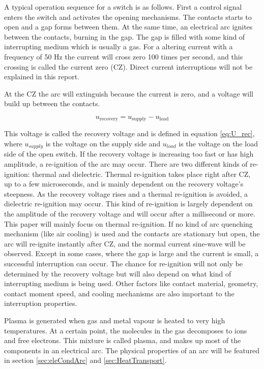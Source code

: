\documentclass[10pt,a4paper,twoside]{article}
\begin{document}
A typical operation sequence for a switch is as follows. First a control signal enters the switch and activates the opening mechanisms. The contacts starts to open and a gap forms between them. At the same time, an electrical arc ignites between the contacts, burning in the gap. The gap is filled with some kind of interrupting medium which is usually a gas. For a altering current with a frequency of 50 Hz the current will cross zero 100 times per second, and this crossing is called the current zero (CZ). Direct current interruptions will not be explained in this report. 

At the CZ the arc will extinguish because the current is zero, and a voltage will build up between the contacts.

\begin{equation} \label{eq:U_rec}
u_\mathrm{{recovery}}=u_\mathrm{{supply}}-u_\mathrm{{load}}
\end{equation} 

This voltage is called the recovery voltage and is defined in equation \eqref{eq:U_rec}, where $u_{supply}$ is the voltage on the supply side and $u_{load}$ is the voltage on the load side of the open switch. If the recovery voltage is increasing too fast or has high amplitude, a re-ignition of the arc may occur. There are two different kinds of re-ignition: thermal and dielectric. Thermal re-ignition takes place right after CZ, up to a few microseconds, and is mainly dependent on the recovery voltage's steepness. As the recovery voltage rises and a thermal re-ignition is avoided, a dielectric re-ignition may occur. This kind of re-ignition is largely dependent on the amplitude of the recovery voltage and will occur after a millisecond or more. This paper will mainly focus on thermal re-ignition. If no kind of arc quenching mechanism (like air cooling) is used and the contacts are stationary but open, the arc will re-ignite instantly after CZ, and the normal current sine-wave will be observed. Except in some cases, where the gap is large and the current is small, a successful interruption can occur. The chance for re-ignition will not only be determined by the recovery voltage but will also depend on what kind of interrupting medium is being used. Other factors like contact material, geometry, contact moment speed, and cooling mechanisms are also important to the interruption properties.

Plasma is generated when gas and metal vapour is heated to very high temperatures. At a certain point, the molecules in the gas decomposes to ions and free electrons. This mixture is called plasma, and makes up most of the components in an electrical arc. The physical properties of an arc will be featured in section \ref{sec:eleCondArc} and \ref{sec:HeatTransport}. 
\end{document}
